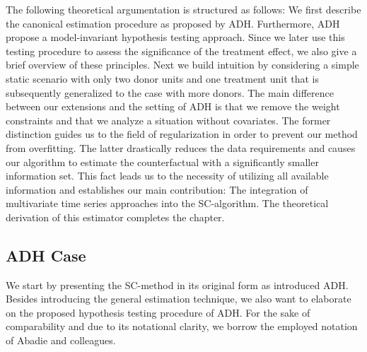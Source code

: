 The following theoretical argumentation is structured as follows: We first describe the canonical estimation procedure as proposed by \ac{ADH}. Furthermore, \ac{ADH} propose a model-invariant hypothesis testing approach. Since we later use this testing procedure to assess the significance of the treatment effect, we also give a brief overview of these principles. Next we build intuition by considering a simple static scenario with only two donor units and one treatment unit that is subsequently generalized to the case with more donors. The main difference between our extensions and the setting of \ac{ADH} is that we remove the weight constraints and that we analyze a situation without covariates. The former distinction guides us to the field of regularization in order to prevent our method from overfitting. The latter drastically reduces the data requirements and causes our algorithm to estimate the counterfactual with a significantly smaller information set. This fact leads us to the necessity of utilizing all available information and establishes our main contribution: The integration of  multivariate time series approaches into the \ac{SC}-algorithm. The theoretical derivation of this estimator completes the chapter.

\subsection{ADH Case}
We start by presenting the \ac{SC}-method in its original form as introduced \ac{ADH}. Besides introducing the general estimation technique, we also want to elaborate on the proposed hypothesis testing procedure of \ac{ADH}. For the sake of comparability and due to its notational clarity, we borrow the employed notation of Abadie and colleagues. 

